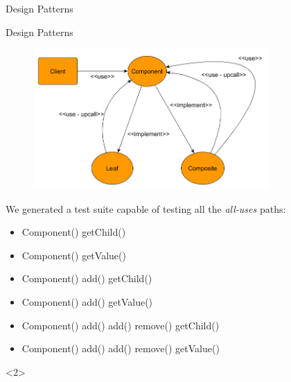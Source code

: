 \documentclass{beamer}
\begin{document}
\begin{section}{Design Patterns}
\begin{subsection}{Design Patterns}
\begin{frame}
{\begin{figure}[!h]
	\centering
	\includegraphics[width=0.8\textwidth]{./Composite/ClassDepencyGraph.png}	
	\label{Codepengraph}
\end{figure}
We generated a test suite capable of testing all the \textit{all-uses} paths:
\begin{itemize}
	\item Component() getChild()
	\item Component() getValue()
	\item Component() add() getChild()
	\item Component() add() getValue()
	\item Component() add() add() remove() getChild()
	\item Component() add() add() remove() getValue() 
\end{itemize}}<2> 		

\end{frame}
\end{subsection}
\end{section}
\end{document}
